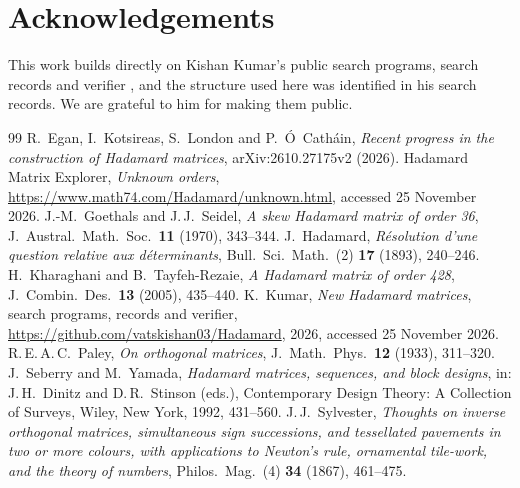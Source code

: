 \documentclass[11pt,colorlinks]{charlie}
\begin{document}
\section*{Acknowledgements}
This work builds directly on Kishan Kumar's public search programs, search records and verifier \cite{Kumar}, and the structure used here was identified in his search records. We are grateful to him for making them public.

\begin{thebibliography}{99}\small
{} R.~Egan, I.~Kotsireas, S.~London and P.~\'O~Cath\'ain, \emph{Recent progress in the construction of Hadamard matrices}, arXiv:2610.27175v2 (2026).
 Hadamard Matrix Explorer, \emph{Unknown orders}, \url{https://www.math74.com/Hadamard/unknown.html}, accessed 25 November 2026.
 J.-M.~Goethals and J.\,J.~Seidel, \emph{A skew Hadamard matrix of order 36}, J.\ Austral.\ Math.\ Soc.\ \textbf{11} (1970), 343--344.
 J.~Hadamard, \emph{R\'esolution d'une question relative aux d\'eterminants}, Bull.\ Sci.\ Math.\ (2) \textbf{17} (1893), 240--246.
 H.~Kharaghani and B.~Tayfeh-Rezaie, \emph{A Hadamard matrix of order 428}, J.\ Combin.\ Des.\ \textbf{13} (2005), 435--440.
 K.~Kumar, \emph{New Hadamard matrices}, search programs, records and verifier, \url{https://github.com/vatskishan03/Hadamard}, 2026, accessed 25 November 2026.
 R.\,E.\,A.\,C.~Paley, \emph{On orthogonal matrices}, J.\ Math.\ Phys.\ \textbf{12} (1933), 311--320.
 J.~Seberry and M.~Yamada, \emph{Hadamard matrices, sequences, and block designs}, in: J.\,H.~Dinitz and D.\,R.~Stinson (eds.), Contemporary Design Theory: A Collection of Surveys, Wiley, New York, 1992, 431--560.
 J.\,J.~Sylvester, \emph{Thoughts on inverse orthogonal matrices, simultaneous sign successions, and tessellated pavements in two or more colours, with applications to Newton's rule, ornamental tile-work, and the theory of numbers}, Philos.\ Mag.\ (4) \textbf{34} (1867), 461--475.
\end{thebibliography}
\end{document}
